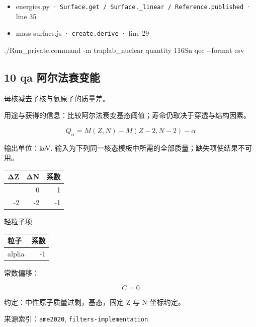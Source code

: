 \documentclass[
  11pt,
  letterpaper,
]{article}
\newenvironment{Shaded}{}{}
\newcommand{\AttributeTok}[1]{\textcolor[rgb]{0.49,0.56,0.16}{#1}}
\newcommand{\ExtensionTok}[1]{#1}
\newcommand{\NormalTok}[1]{#1}
\providecommand{\tightlist}{%
  \setlength{\itemsep}{0pt}\setlength{\parskip}{0pt}}
\begin{document}
\begin{itemize}
\tightlist
\item
  energies.py ·
  \texttt{Surface.get\ /\ Surface.\_linear\ /\ Reference.published} ·
  line 35
\item
  mass-surface.js · \texttt{create.derive} · line 29
\end{itemize}

\begin{Shaded}
\begin{Highlighting}[]
\ExtensionTok{./Run\_private.command} \AttributeTok{{-}m}\NormalTok{ traplab\_nuclear quantity 116Sn qec }\AttributeTok{{-}{-}format}\NormalTok{ csv}
\end{Highlighting}
\end{Shaded}

\subsection{10 qa
阿尔法衰变能}\label{qa-ux963fux5c14ux6cd5ux8870ux53d8ux80fd}

母核减去子核与氦原子的质量差。

用途与获得的信息：比较阿尔法衰变基态阈值；寿命仍取决于穿透与结构因素。

\[
Q_\alpha=M(Z,N)-M(Z-2,N-2)-\alpha
\]

输出单位：keV.
输入为下列同一核态模板中所需的全部质量；缺失项使结果不可用。

\begin{longtable}[]{@{}rrr@{}}
\toprule\noalign{}
ΔZ & ΔN & 系数 \\
\midrule\noalign{}
\endhead
\bottomrule\noalign{}
\endlastfoot
0 & 0 & 1 \\
-2 & -2 & -1 \\
\end{longtable}

轻粒子项

\begin{longtable}[]{@{}lr@{}}
\toprule\noalign{}
粒子 & 系数 \\
\midrule\noalign{}
\endhead
\bottomrule\noalign{}
\endlastfoot
alpha & -1 \\
\end{longtable}

常数偏移：

\[
C=0
\]

约定：中性原子质量过剩，基态，固定 Z 与 N 坐标约定。

来源索引：\texttt{ame2020}, \texttt{filters-implementation}.
\end{document}
